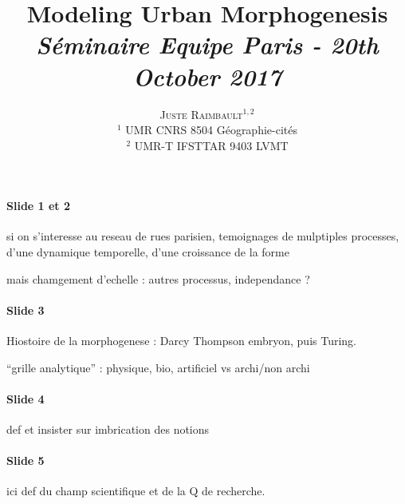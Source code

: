 \documentclass[11pt]{article}
\newcommand{\noun}[1]{\textsc{#1}}
\begin{document}
\title{Modeling Urban Morphogenesis
\bigskip\\
\textit{Séminaire Equipe Paris - 20th October 2017}
}
\author{\noun{Juste Raimbault}$^{1,2}$\medskip\\
$^1$ UMR CNRS 8504 Géographie-cités\\
$^2$ UMR-T IFSTTAR 9403 LVMT
}
\date{}

\maketitle

\justify


\paragraph{Slide 1 et 2}

si on s'interesse au reseau de rues parisien, temoignages de mulptiples processes, d'une dynamique temporelle, d'une croissance de la forme

mais chamgement d'echelle : autres processus, independance ?


\paragraph{Slide 3}

Hiostoire de la morphogenese : Darcy Thompson embryon, puis Turing.

``grille analytique'' : physique, bio, artificiel vs archi/non archi

\paragraph{Slide 4}

def et insister sur imbrication des notions

\paragraph{Slide 5}

ici def du champ scientifique et de la Q de recherche.
\end{document}
